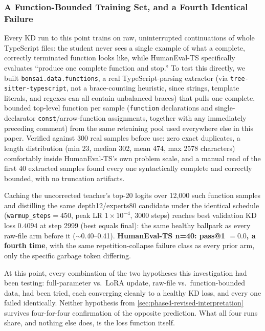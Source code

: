 \documentclass{article}
\theoremstyle{plain}
\theoremstyle{definition}
\theoremstyle{remark}
\begin{document}
\subsubsection{A Function-Bounded Training Set, and a Fourth Identical Failure}
\label{sec:phase4-functions}

Every KD run to this point trains on raw, uninterrupted continuations
of whole TypeScript files: the student never sees a single example of
what a complete, correctly terminated function looks like, while
HumanEval-TS specifically evaluates ``produce one complete function and
stop.'' To test this directly, we built \texttt{bonsai.data.functions},
a real TypeScript-parsing extractor (via \texttt{tree-sitter-typescript},
not a brace-counting heuristic, since strings, template literals, and
regexes can all contain unbalanced braces) that pulls one complete,
bounded top-level function per sample (\texttt{function} declarations
and single-declarator \texttt{const}/arrow-function assignments,
together with any immediately preceding comment) from the same
retraining pool used everywhere else in this paper. Verified against
300 real samples before use: zero exact duplicates, a length
distribution (min 23, median 302, mean 474, max 2578 characters)
comfortably inside HumanEval-TS's own problem scale, and a manual read
of the first 40 extracted samples found every one syntactically
complete and correctly bounded, with no truncation artifacts.

Caching the uncorrected teacher's top-20 logits over 12,000 such
function samples and distilling the same depth12/experts80 candidate
under the identical schedule (\texttt{warmup\_steps}$=450$, peak LR
$1\times10^{-4}$, 3000 steps) reaches best validation KD loss $0.4094$
at step 2999 (best equals final): the same healthy ballpark as every
raw-file arm before it ($\sim$0.40--0.41). \textbf{HumanEval-TS n=40:
pass@1 $=0.0$, a fourth time}, with the same repetition-collapse
failure class as every prior arm, only the specific garbage token
differing.

At this point, every combination of the two hypotheses this
investigation had been testing: full-parameter vs.\ LoRA update,
raw-file vs.\ function-bounded data, had been tried, each converging
cleanly to a healthy KD loss, and every one failed identically. Neither
hypothesis from \cref{sec:phase4-revised-interpretation} survives
four-for-four confirmation of the opposite prediction. What all four
runs share, and nothing else does, is the loss function itself.
\end{document}
